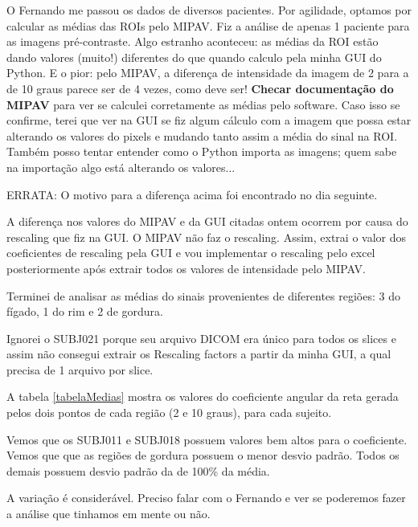\documentclass[idxtotoc,hyperref,openany]{labbook} %
\begin{document}
O Fernando me passou os dados de diversos pacientes. Por agilidade, optamos por calcular as médias das ROIs pelo MIPAV. Fiz a análise de apenas 1 paciente para as imagens pré-contraste. Algo estranho aconteceu: as médias da ROI estão dando valores (muito!) diferentes do que quando calculo pela minha GUI do Python. E o pior: pelo MIPAV, a diferença de intensidade da imagem de 2 para a de 10 graus parece ser de 4 vezes, como deve ser! \textbf{Checar documentação do MIPAV} para ver se calculei corretamente as médias pelo software. Caso isso se confirme, terei que ver na GUI se fiz algum cálculo com a imagem que possa estar alterando os valores do pixels e mudando tanto assim a média do sinal na ROI. Também posso tentar entender como o Python importa as imagens; quem sabe na importação algo está alterando os valores...

ERRATA: O motivo para a diferença acima foi encontrado no dia seguinte.



A diferença nos valores do MIPAV e da GUI citadas ontem ocorrem por causa do rescaling que fiz na GUI. O MIPAV não faz o rescaling. Assim, extrai o valor dos coeficientes de rescaling pela GUI e vou implementar o rescaling pelo excel posteriormente após extrair todos os valores de intensidade pelo MIPAV.



Terminei de analisar as médias do sinais provenientes de diferentes regiões: 3 do fígado, 1 do rim e 2 de gordura. 

Ignorei o SUBJ021 porque seu arquivo DICOM era único para todos os slices e assim não consegui extrair os Rescaling factors a partir da minha GUI, a qual precisa de 1 arquivo por slice.

A tabela \ref{tabelaMedias} mostra os valores do coeficiente angular da reta gerada pelos dois pontos de cada região (2 e 10 graus), para cada sujeito. 

Vemos que os SUBJ011 e SUBJ018 possuem valores bem altos para o coeficiente. Vemos que que as regiões de gordura possuem o menor desvio padrão. Todos os demais possuem desvio padrão da de 100\% da média.

A variação é considerável. Preciso falar com o Fernando e ver se poderemos fazer a análise que tinhamos em mente ou não.
\end{document}
